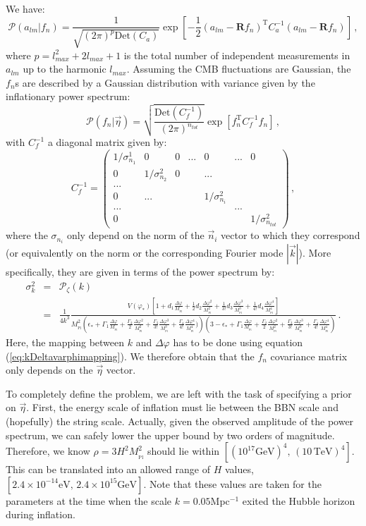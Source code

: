 \documentclass[prd, onecolumn, floatfix, letterpaper, nofootinbib, amsmath, amssymb, superscriptaddress]{revtex4}
\renewcommand{\(}{\left(}
\renewcommand{\)}{\right)}
\renewcommand{\[}{\left[}
\renewcommand{\]}{\right]}
\def\be{\begin{equation}}
\def\ee{\end{equation}}
\def\bea{\begin{eqnarray}}
\def\eea{\end{eqnarray}}
\newcommand{\Mp}{M_{_\mathrm{Pl}}}
\begin{document}
We have:
\be
\label{eq:aPDF}
	\mathcal{P}( a_{lm}| f_n) =\frac{1}{\sqrt{(2\pi)^{p}\mathrm{Det}(C_a)}} \exp\left[ -\frac{1}{2}\left(a_{lm}-\mathbf{R} f_n\right)^{\mathrm{T}}C^{-1}_a\left(a_{lm}-\mathbf{R} f_n\right)\right]\, ,
\ee
where $p=l_{max}^2+2l_{max}+1$ is the total number of independent measurements in $a_{lm}$ up to the harmonic $l_{max}$. Assuming the CMB fluctuations are Gaussian, the $f_n$s are described by a Gaussian distribution with variance given by the inflationary power spectrum:
\be
\label{eq:fnPDF}
	\mathcal{P}( f_n|\vec{\eta})= \sqrt{\frac{\mathrm{Det}(C_f^{-1})}{(2\pi)^{n_{tot}}}}\exp\left[ f_n^{\mathrm{T}}C_f^{-1}f_n \right]\,, 
\ee
with $C_f^{-1}$ a diagonal matrix given by:
\be
\label{eq:fncovariancematrix}
	C_f^{-1}  =\left(  \begin{array}{ccccccc} 1/\sigma_{n_1}^1&0&0&... &0 &...&0\\ 0& 1/\sigma_{n_2}^2 &0& &... \\ ... & & & &\\ 0&...&  & &1/\sigma_{n_i}^2\\
	...&&&&&...&\\
	0&&&&&&1/\sigma_{n_{tot}}^2
	\end{array} \right)\, ,
\ee
where the $\sigma_{n_i}$ only depend on the norm of the $\vec{n}_i$ vector to which they correspond (or equivalently on the norm or the corresponding Fourier mode $|\vec{k}|$). More specifically, they are given in terms of the power spectrum by:
\bea
	\sigma_k^2&=&\mathcal{P}_\zeta(k)\nonumber\\
	&=&\frac{1}{4k^{3}}\frac{V(\varphi_*)\left[1+d_1\frac{\Delta\varphi}{\Mp}+\frac{1}{2}d_2\frac{\Delta\varphi^2}{\Mp^2}+\frac{1}{3!}d_3\frac{\Delta\varphi^3}{\Mp^3} +\frac{1}{4!}d_4\frac{\Delta\varphi^4}{\Mp^4}\right]}{\Mp^2\left( \epsilon_*+\Gamma_1\frac{\Delta\varphi}{\Mp}+\frac{\Gamma_2}{2}\frac{\Delta\varphi^2}{\Mp^2}+\frac{\Gamma_3}{3!}\frac{\Delta\varphi^3}{\Mp^3}+\frac{\Gamma_4}{4!}\frac{\Delta\varphi^4}{\Mp^4})\right)\left(3-\epsilon_*+\Gamma_1\frac{\Delta\varphi}{\Mp}+\frac{\Gamma_2}{2}\frac{\Delta\varphi^2}{\Mp^2}+\frac{\Gamma_3}{3!}\frac{\Delta\varphi^3}{\Mp^3}+\frac{\Gamma_4}{4!}\frac{\Delta\varphi^4}{\Mp^4}\right)}\, .
\eea
Here, the mapping between $k$ and $\Delta \varphi$ has to be done using equation (\ref{eq:kDeltavarphimapping}). We therefore obtain that the $f_n$ covariance matrix only depends on the $\vec{\eta}$ vector. 

To completely define the problem, we are left with the task of specifying a prior on $\vec{\eta}$.  First, the energy scale of inflation must lie between the BBN scale and (hopefully) the string scale. Actually, given the observed amplitude of the power spectrum, we can safely lower the upper bound by two orders of magnitude. Therefore, we know $\rho=3H^2\Mp^2$ should lie within $\left[ (10^{17}\mathrm{GeV})^4, \, (10 \, \mathrm{TeV})^4 \right]$. This can be translated into an allowed range of $H$ values, $[2.4\times 10^{-14}\mathrm{eV} ,\,2.4\times10^{15}\mathrm{GeV}]$. Note that these values are taken for the parameters at the time when the scale $k=0.05$Mpc$^{-1}$ exited the Hubble horizon during inflation.
\end{document}
